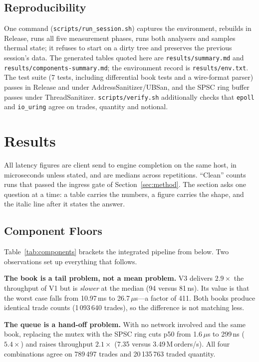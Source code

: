 \documentclass[conference]{IEEEtran}
\newcommand{\us}{\,$\mu$s}
\newcommand{\ns}{\,ns}
\newcommand{\Mops}{\,M\,orders/s}
\begin{document}
\subsection{Reproducibility}
One command (\texttt{scripts/run\_session.sh}) captures the environment, rebuilds
in Release, runs all five measurement phases, runs both analysers and samples
thermal state; it refuses to start on a dirty tree and preserves the previous
session's data. The generated tables quoted here are
\texttt{results/summary.md} and \texttt{results/components-summary.md}; the
environment record is \texttt{results/env.txt}. The test suite (7 tests,
including differential book tests and a wire-format parser) passes in Release and
under AddressSanitizer/UBSan, and the SPSC ring buffer passes under
ThreadSanitizer. \texttt{scripts/verify.sh} additionally checks that
\texttt{epoll} and \texttt{io\_uring} agree on trades, quantity and notional.

\section{Results}
\label{sec:results}

All latency figures are client send to engine completion on the same host, in
microseconds unless stated, and are medians across repetitions. ``Clean'' counts
runs that passed the ingress gate of Section~\ref{sec:method}. The section asks
one question at a time: a table carries the numbers, a figure carries the shape,
and the italic line after it states the answer.

\subsection{Component Floors}
Table~\ref{tab:components} brackets the integrated pipeline from below. Two
observations set up everything that follows.

\textbf{The book is a tail problem, not a mean problem.} V3 delivers
$2.9\times$ the throughput of V1 but is \emph{slower} at the median (94 versus
81\ns). Its value is that the worst case falls from 10.97\,ms to 26.7\us---a
factor of 411. Both books produce identical trade counts (1\,093\,640 trades),
so the difference is not matching less.

\textbf{The queue is a hand-off problem.} With no network involved and the same
book, replacing the mutex with the SPSC ring cuts p50 from 1.6\us{} to 299\ns{}
($5.4\times$) and raises throughput $2.1\times$ (7.35 versus 3.49\Mops). All four
combinations agree on 789\,497 trades and 20\,135\,763 traded quantity.
\end{document}
